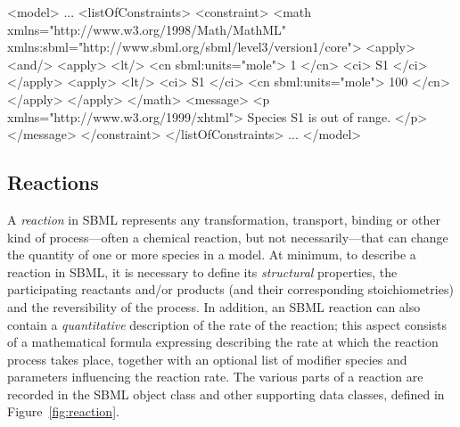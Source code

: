 \begin{example}
<model>
    ...
    <listOfConstraints>
        <constraint>
            <math xmlns="http://www.w3.org/1998/Math/MathML"
                  xmlns:sbml="http://www.sbml.org/sbml/level3/version1/core">
                <apply>
                    <and/>
                        <apply> <lt/> <cn sbml:units="mole"> 1 </cn> <ci> S1 </ci> </apply>
                        <apply> <lt/> <ci> S1 </ci> <cn sbml:units="mole"> 100 </cn> </apply>
                </apply>
            </math>
            <message>
                <p xmlns="http://www.w3.org/1999/xhtml"> Species S1 is out of range. </p>
            </message>
        </constraint>
    </listOfConstraints>
    ...
</model>
\end{example}


\subsection{Reactions}
\label{sec:reactions}

A \emph{reaction} in SBML represents any transformation,
transport, binding or other kind of process---often a chemical
reaction, but not necessarily---that can change the quantity of
one or more species in a model.  At minimum, to describe a
reaction in SBML, it is necessary to define its \emph{structural}
properties, \ie the participating reactants and/or products (and
their corresponding stoichiometries) and the reversibility of the
process.  In addition, an SBML reaction can also contain a
\emph{quantitative} description of the rate of the reaction; this
aspect consists of a mathematical formula expressing describing
the rate at which the reaction process takes place, together with
an optional list of modifier species and parameters influencing
the reaction rate.  The various parts of a reaction are recorded
in the SBML \Reaction object class and other supporting data
classes, defined in Figure~\vref{fig:reaction}.


